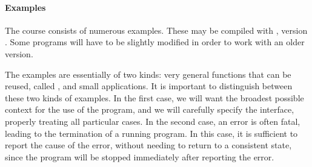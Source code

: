 \paragraph{Examples}

The course consists of numerous examples. These may be compiled with 
{\ocaml}, version {\ocamlversion}.  Some programs will have to be
slightly modified in order to work with an older version. 

The examples are essentially of two kinds: very general functions that
can be reused, called , and small
applications. It is important to distinguish between these two kinds
of examples. In the first case, we will want the broadest possible
context for the use of the program, and we will carefully specify the
interface, properly treating all particular cases.  In the second
case, an error is often fatal, leading to the termination of a running
program. In this case, it is sufficient to report the cause of the
error, without needing to return to a consistent state, since the
program will be stopped immediately after reporting the error.
